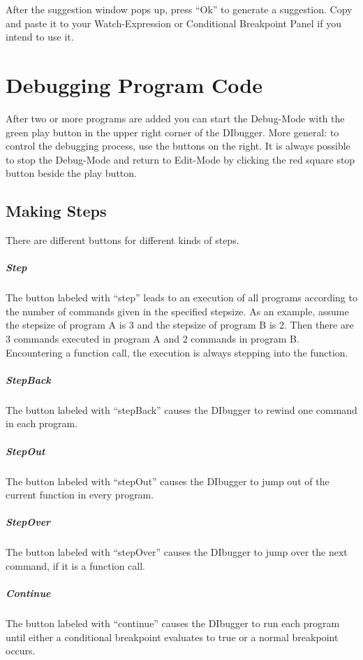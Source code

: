 \documentclass[parskip=full]{memoir}
\begin{document}
After the suggestion window pops up, press \enquote{Ok} to generate a suggestion.
Copy and paste it to your Watch-Expression or Conditional Breakpoint Panel if you intend to use it.

\chapter{Debugging Program Code} %
After two or more programs are added you can start the Debug-Mode with the green play button in the upper right corner of the DIbugger. More general: to control the debugging process, use the buttons on the right. It is always possible to stop the Debug-Mode and return to Edit-Mode by clicking the red square stop button beside the play button.
\section{Making Steps}
There are different buttons for different kinds of steps.
\paragraph{Step}
The button labeled with \enquote{step} leads to an execution of all programs according to the number of commands given in the specified stepsize. As an example, assume the stepsize of program A is 3 and the stepsize of program B is 2. Then there are 3 commands executed in program A and 2 commands in program B. Encountering a function call, the execution is always stepping into the function.
\paragraph{StepBack}
The button labeled with \enquote{stepBack} causes the DIbugger to rewind one command in each program.
\paragraph{StepOut}
The button labeled with \enquote{stepOut} causes the DIbugger to jump out of the current function in every program.
\paragraph{StepOver}
The button labeled with \enquote{stepOver} causes the DIbugger to jump over the next command, if it is a function call.
\paragraph{Continue}
The button labeled with \enquote{continue} causes the DIbugger to run each program until either a conditional breakpoint evaluates to true or a normal breakpoint occurs.
\end{document}
